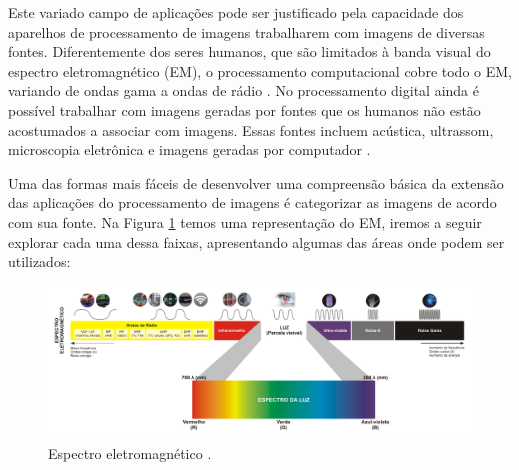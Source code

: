 \documentclass[
  brazilian,
]{book}
\begin{document}
Este variado campo de aplicações pode ser justificado pela capacidade dos aparelhos de processamento de imagens trabalharem com imagens de diversas fontes. Diferentemente dos seres humanos, que são limitados à banda visual do espectro eletromagnético (EM), o processamento computacional cobre todo o EM, variando de ondas gama a ondas de rádio \autocite[p.~1]{gonzalez2010}. No processamento digital ainda é possível trabalhar com imagens geradas por fontes que os humanos não estão acostumados a associar com imagens. Essas fontes incluem acústica, ultrassom, microscopia eletrônica e imagens geradas por computador \autocite[p.~13]{gonzalez2010}.

Uma das formas mais fáceis de desenvolver uma compreensão básica da extensão das aplicações do processamento de imagens é categorizar as imagens de acordo com sua fonte. Na Figura \ref{fig:espectro} temos uma representação do EM, iremos a seguir explorar cada uma dessa faixas, apresentando algumas das áreas onde podem ser utilizados:



\begin{figure}

{\centering \includegraphics[width=0.9\linewidth]{imagens/01-introducao/espectro} 

}

\caption{Espectro eletromagnético \autocite{img:espectro}.}\label{fig:espectro}
\end{figure}
\end{document}
